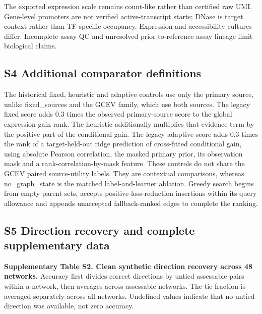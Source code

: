\documentclass[
  11pt,
]{article}
\begin{document}
The exported expression scale remains count-like rather than certified
raw UMI. Gene-level promoters are not verified active-transcript starts;
DNase is target context rather than TF-specific occupancy. Expression
and accessibility cultures differ. Incomplete assay QC and unresolved
prior-to-reference assay lineage limit biological claims.

\subsection{S4 Additional comparator
definitions}\label{s4-additional-comparator-definitions}

The historical fixed, heuristic and adaptive controls use only the
primary source, unlike fixed\_sources and the GCEV family, which use
both sources. The legacy fixed score adds 0.3 times the observed
primary-source score to the global expression-gain rank. The heuristic
additionally multiplies that evidence term by the positive part of the
conditional gain. The legacy adaptive score adds 0.3 times the rank of a
target-held-out ridge prediction of cross-fitted conditional gain, using
absolute Pearson correlation, the masked primary prior, its observation
mask and a rank-correlation-by-mask feature. These controls do not share
the GCEV paired source-utility labels. They are contextual comparisons,
whereas no\_graph\_state is the matched label-and-learner ablation.
Greedy search begins from empty parent sets, accepts
positive-loss-reduction insertions within its query allowance and
appends unaccepted fallback-ranked edges to complete the ranking.

\subsection{S5 Direction recovery and complete supplementary
data}\label{s5-direction-recovery-and-complete-supplementary-data}

\textbf{Supplementary Table S2. Clean synthetic direction recovery
across 48 networks.} Accuracy first divides correct directions by untied
assessable pairs within a network, then averages across assessable
networks. The tie fraction is averaged separately across all networks.
Undefined values indicate that no untied direction was available, not
zero accuracy.
\end{document}
